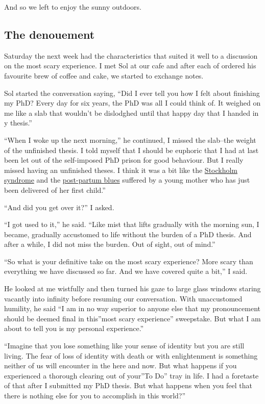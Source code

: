 \documentclass[
  a4paper,
]{article}
\begin{document}
And so we left to enjoy the sunny outdoors.

\hypertarget{the-denouement}{%
\subsection{The denouement}\label{the-denouement}}

Saturday the next week had the characteristics that suited it well to a
discussion on the most scary experience. I met Sol at our cafe and after
each of ordered his favourite brew of coffee and cake, we started to
exchange notes.

Sol started the conversation saying, ``Did I ever tell you how I felt
about finishing my PhD? Every day for six years, the PhD was all I could
think of. It weighed on me like a slab that wouldn't be dislodghed until
that happy day that I handed in y thesis.''

``When I woke up the next morning,'' he continued, I missed the
slab--the weight of the unfinished thesis. I told myself that I should
be euphoric that I had at last been let out of the self-imposed PhD
prison for good behaviour. But I really missed having an unfinished
theses. I think it was a bit like the \href{}{Stockholm syndrome} and
the \href{}{post-partum blues} suffered by a young mother who has just
been delivered of her first child.''

``And did you get over it?'' I asked.

``I got used to it,'' he said. ``Like mist that lifts gradually with the
morning sun, I became, gradually accustomed to life without the burden
of a PhD thesis. And after a while, I did not miss the burden. Out of
sight, out of mind.''

``So what is your definitive take on the most scary experience? More
scary than everything we have discussed so far. And we have covered
quite a bit,'' I said.

He looked at me wistfully and then turned his gaze to large glass
windows staring vacantly into infinity before resuming our conversation.
With unaccustomed humility, he said ``I am in no way superior to anyone
else that my pronouncement should be deemed final in this''most scary
experience'' sweepstake. But what I am about to tell you is my personal
experience.''

``Imagine that you lose something like your sense of identity but you
are still living. The fear of loss of identity with death or with
enlightenment is something neither of us will encounter in the here and
now. But what happens if you experienced a thorough clearing out of
your''To Do'' tray in life. I had a foretaste of that after I submitted
my PhD thesis. But what happens when you feel that there is nothing else
for you to accomplish in this world?''
\end{document}
